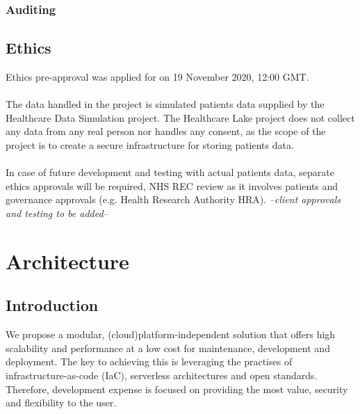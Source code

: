 \documentclass[10pt]{article}
\begin{document}
\subsubsection{Auditing}

\subsection{Ethics}
Ethics pre-approval was applied for on 19 November 2020, 12:00 GMT. 
\\
\\
The data handled in the project is simulated patients data supplied by the Healthcare Data Simulation project. The Healthcare Lake project does not collect any data from any real person nor handles any consent, as the scope of the project is to create a secure infrastructure for storing patients data. \\ \\
In case of future development and testing with actual patients data, separate ethics approvals will be required, NHS REC review as it involves patients and governance approvals (e.g. Health Research Authority HRA). \emph{--client approvals and testing to be added--}

\newpage
\section{Architecture}
\subsection{Introduction}
We propose a modular, (cloud)platform-independent solution that offers high scalability and performance at a low cost for maintenance, development and deployment. The key to achieving this is leveraging the practises of infrastructure-as-code (IaC), serverless architectures and open standards. Therefore, development expense is focused on providing the most value, security and flexibility to the user.\\
\end{document}

